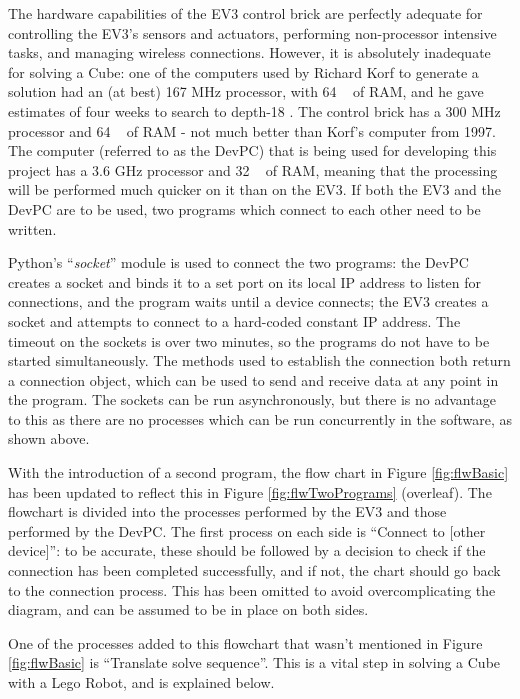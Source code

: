 \documentclass{report}
\newcommand{\tit}[1]{\textit{#1}}
\newcommand{\propernoun}[1]{\enquote{\tit{#1}}}
\newcommand{\depth}[1]{depth-#1}
\begin{document}
    The hardware capabilities of the EV3 control brick are perfectly adequate for controlling the EV3's sensors and actuators, performing non-processor intensive tasks, and managing wireless connections. However, it is absolutely inadequate for solving a Cube: one of the computers used by Richard Korf to generate a solution had an (at best) 167 \si{\mega\hertz} processor, with 64 \si{\mega\byte} of RAM, and he gave estimates of four weeks to search to \depth{18} \cite{Korf1997}. The control brick has a 300 \si{\mega\hertz} processor and 64 \si{\mega\byte} of RAM - not much better than Korf's computer from 1997. The computer (referred to as the DevPC) that is being used for developing this project has a 3.6 \si{\giga\hertz} processor and 32 \si{\giga\byte} of RAM, meaning that the processing will be performed much quicker on it than on the EV3. If both the EV3 and the DevPC are to be used, two programs which connect to each other need to be written.
    
    Python's \propernoun{socket} module is used to connect the two programs: the DevPC creates a socket and binds it to a set port on its local IP address to listen for connections, and the program waits until a device connects; the EV3 creates a socket and attempts to connect to a hard-coded constant IP address. The timeout on the sockets is over two minutes, so the programs do not have to be started simultaneously. The methods used to establish the connection both return a connection object, which can be used to send and receive data at any point in the program. The sockets can be run asynchronously, but there is no advantage to this as there are no processes which can be run concurrently in the software, as shown above.
    
    With the introduction of a second program, the flow chart in Figure \ref{fig:flwBasic} has been updated to reflect this in Figure \ref{fig:flwTwoPrograms} (overleaf). The flowchart is divided into the processes performed by the EV3 and those performed by the DevPC. The first process on each side is \enquote{Connect to [other device]}: to be accurate, these should be followed by a decision to check if the connection has been completed successfully, and if not, the chart should go back to the connection process. This has been omitted to avoid overcomplicating the diagram, and can be assumed to be in place on both sides.
    
    One of the processes added to this flowchart that wasn't mentioned in Figure \ref{fig:flwBasic} is \enquote{Translate solve sequence}. This is a vital step in solving a Cube with a Lego Robot, and is explained below.
    
\end{document}
